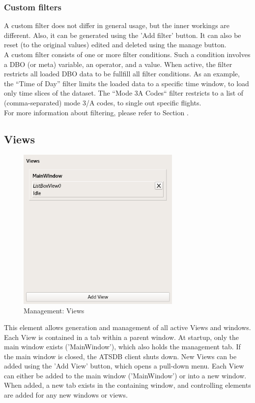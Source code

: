 \documentclass[10pt,letterpaper,extrafontsizes]{memoir}
\begin{document}
\subsubsection{Custom filters}
A  custom  filter  does  not  differ  in  general  usage,  but  the  inner  workings  are  different.   Also,  it  can  be generated using the 'Add filter' button. It can also be reset (to the original values) edited and deleted using
the manage button. \\
A custom filter consists of one or more filter conditions.  Such a condition involves a DBO (or meta) variable, an operator, and a value.  When active, the filter restricts all loaded DBO data to be fullfill all filter conditions.
As an example, the ``Time of Day'' filter limits the loaded data to a specific time window, to load only time slices of the dataset.  The ``Mode 3A Codes`` filter restricts to a list of (comma-separated) mode 3/A codes, to single out specific flights. \\

For more information about filtering, please refer to Section .

\subsection{Views}

\begin{figure}[H]
  \center
    \includegraphics[width=8cm,frame]{../screenshots/management_views.png}
  \caption{Management: Views}
  \label{fig:management_views}
\end{figure}

This element allows generation and management of all active Views and windows. Each View is contained
in a tab within a parent window.  At startup, only the main window exists ('MainWindow'), which also holds
the management tab. If the main window is closed, the ATSDB client shuts down. New Views can be added using the 'Add View' button, which opens a pull-down menu. Each View can either be added to the main window ('MainWindow') or into a new window. When added, a new tab exists in the containing window, and controlling elements are added for any new
windows or views. \\
\end{document}
